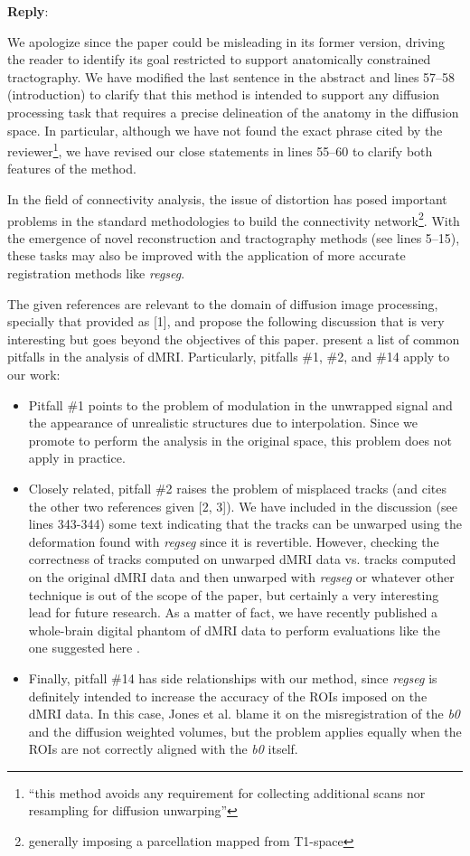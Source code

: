 \documentclass[9pt]{memoir}
\newcommand{\reply}{\par\fontshape{n}\selectfont \noindent \textbf{Reply}:\ }
\begin{document}
\reply{%
We apologize since the paper could be misleading in its former version, driving
  the reader to identify its goal restricted to support anatomically constrained
  tractography.
We have modified the last sentence in the abstract and lines 57--58 (introduction) to
  clarify that this method is intended to support any diffusion processing task that
  requires a precise delineation of the anatomy in the diffusion space.
In particular, although we have not found the exact phrase cited by the
 reviewer\footnote{``this method avoids any
 requirement for collecting additional scans nor resampling for diffusion unwarping''},
 we have revised our close statements in lines 55--60 to clarify both features
 of the method.

In the field of connectivity analysis, the issue of distortion has posed important problems in the
  standard methodologies to build the connectivity network\footnote{generally imposing
  a parcellation mapped from T1-space}.
With the emergence of novel reconstruction and tractography methods (see lines 5--15),
  these tasks may also be improved with the application of more accurate registration
  methods like \emph{regseg}.

The given references are relevant to the domain of diffusion image processing,
  specially that provided as [1], and propose the following discussion that
  is very interesting but goes beyond the objectives of this paper.
\cite{jones_twentyfive_2010} present a list of common pitfalls in the
  analysis of dMRI.
Particularly, pitfalls \#1, \#2, and \#14 apply to our work:
\begin{itemize}
\item Pitfall \#1 points to the problem of modulation in the unwrapped signal and the
  appearance of unrealistic structures due to interpolation.
Since we promote to perform the analysis in the original space, this problem does not 
  apply in practice.
\item Closely related, pitfall \#2 raises the problem of misplaced tracks (and cites
  the other two references given [2, 3]).
We have included in the discussion (see lines 343-344) some text indicating that the tracks
  can be unwarped using the deformation found with \emph{regseg} since it is revertible.
However, checking the correctness of tracks computed on unwarped dMRI data vs. tracks computed
  on the original dMRI data and then unwarped with \emph{regseg} or whatever other
  technique is out of the scope of the paper, but certainly a very interesting lead for
  future research.
As a matter of fact, we have recently published a whole-brain digital phantom of dMRI 
  data \citep{esteban_diffantom_2016} to perform evaluations like the one suggested 
  here \citep[for instance, please see][Chapter 5]{esteban_image_2015}.
\item Finally, pitfall \#14 has side relationships with our method, since \emph{regseg} is
  definitely intended to increase the accuracy of the ROIs imposed on the dMRI data.
In this case, Jones et al. blame it on the misregistration of the \emph{b0} and the
  diffusion weighted volumes, but the problem applies equally when the ROIs are
  not correctly aligned with the \emph{b0} itself.


\end{itemize}}
\end{document}
